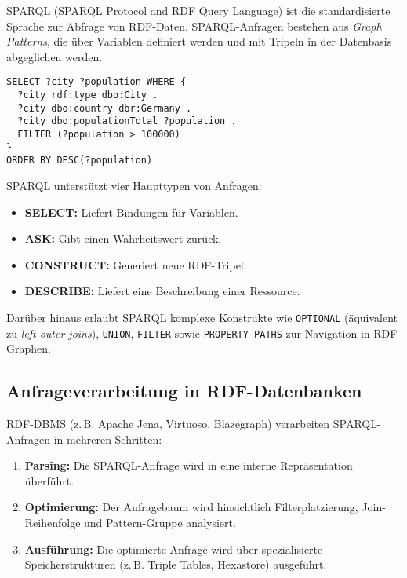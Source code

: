 \documentclass[12pt]{article}
\begin{document}
SPARQL (SPARQL Protocol and RDF Query Language) ist die standardisierte Sprache zur Abfrage von RDF-Daten. SPARQL-Anfragen bestehen aus \textit{Graph Patterns}, die über Variablen definiert werden und mit Tripeln in der Datenbasis abgeglichen werden.

\begin{lstlisting}[caption=SPARQL-Abfrage nach Städten mit mehr als 100.000 Einwohnern]
SELECT ?city ?population WHERE {
  ?city rdf:type dbo:City .
  ?city dbo:country dbr:Germany .
  ?city dbo:populationTotal ?population .
  FILTER (?population > 100000)
}
ORDER BY DESC(?population)
\end{lstlisting}

SPARQL unterstützt vier Haupttypen von Anfragen:
\begin{itemize}
    \item \textbf{SELECT:} Liefert Bindungen für Variablen.
    \item \textbf{ASK:} Gibt einen Wahrheitswert zurück.
    \item \textbf{CONSTRUCT:} Generiert neue RDF-Tripel.
    \item \textbf{DESCRIBE:} Liefert eine Beschreibung einer Ressource.
\end{itemize}

Darüber hinaus erlaubt SPARQL komplexe Konstrukte wie \texttt{OPTIONAL} (äquivalent zu \textit{left outer joins}), \texttt{UNION}, \texttt{FILTER} sowie \texttt{PROPERTY PATHS} zur Navigation in RDF-Graphen.

\subsection{Anfrageverarbeitung in RDF-Datenbanken}

RDF-DBMS (z.\,B. Apache Jena, Virtuoso, Blazegraph) verarbeiten SPARQL-Anfragen in mehreren Schritten:

\begin{enumerate}
    \item \textbf{Parsing:} Die SPARQL-Anfrage wird in eine interne Repräsentation überführt.
    \item \textbf{Optimierung:} Der Anfragebaum wird hinsichtlich Filterplatzierung, Join-Reihenfolge und Pattern-Gruppe analysiert.
    \item \textbf{Ausführung:} Die optimierte Anfrage wird über spezialisierte Speicherstrukturen (z.\,B. Triple Tables, Hexastore) ausgeführt.
\end{enumerate}
\end{document}
